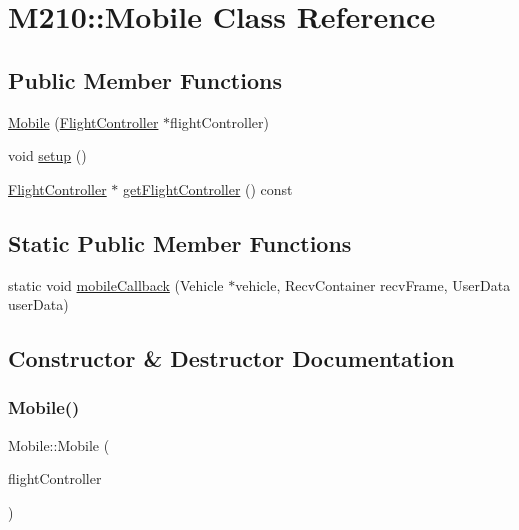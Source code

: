 \hypertarget{class_m210_1_1_mobile}{}\section{M210\+:\+:Mobile Class Reference}
\label{class_m210_1_1_mobile}
\subsection*{Public Member Functions}
\begin{DoxyCompactItemize}
\item 
\mbox{\hyperlink{class_m210_1_1_mobile_aa3e3dfa96e148844b0f2cfa912e0e615}{Mobile}} (\mbox{\hyperlink{class_m210_1_1_flight_controller}{Flight\+Controller}} $\ast$flight\+Controller)
\item 
void \mbox{\hyperlink{class_m210_1_1_mobile_a9315a171e151194c073ef6101a5a395f}{setup}} ()
\item 
\mbox{\hyperlink{class_m210_1_1_flight_controller}{Flight\+Controller}} $\ast$ \mbox{\hyperlink{class_m210_1_1_mobile_ad4cdcfe5206d1aae2b62c457591ef480}{get\+Flight\+Controller}} () const
\end{DoxyCompactItemize}
\subsection*{Static Public Member Functions}
\begin{DoxyCompactItemize}
\item 
static void \mbox{\hyperlink{class_m210_1_1_mobile_a1213532d9326b0bbb8b679299c93a1a2}{mobile\+Callback}} (Vehicle $\ast$vehicle, Recv\+Container recv\+Frame, User\+Data user\+Data)
\end{DoxyCompactItemize}


\subsection{Constructor \& Destructor Documentation}
\mbox{\label{class_m210_1_1_mobile_aa3e3dfa96e148844b0f2cfa912e0e615}} 
\subsubsection{\texorpdfstring{Mobile()}{Mobile()}}
{\footnotesize\ttfamily Mobile\+::\+Mobile (\begin{DoxyParamCaption}\item[{\mbox{\hyperlink{class_m210_1_1_flight_controller}{Flight\+Controller}} $\ast$}]{flight\+Controller }\end{DoxyParamCaption})\hspace{0.3cm}{\ttfamily [explicit]}}

